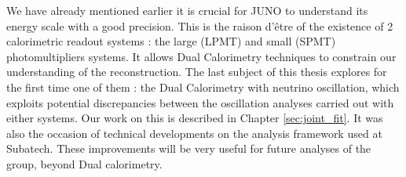 \hfill

We have already mentioned earlier it is crucial for JUNO to understand its energy scale with a good precision. This is the raison d'être of the existence of 2 calorimetric readout systems : the large (LPMT) and small (SPMT) photomultipliers systems.
It allows Dual Calorimetry techniques to constrain our understanding of the reconstruction. The last subject of this thesis explores for the first time one of them : the Dual Calorimetry with neutrino oscillation, which exploits potential discrepancies between the oscillation analyses carried out with either systems.
Our work on this is described in Chapter \ref{sec:joint_fit}.
It was also the occasion of technical developments on the analysis framework used at Subatech. These improvements will be very useful for future analyses of the group, beyond Dual calorimetry.

